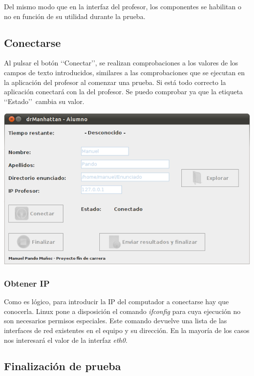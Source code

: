 \documentclass[11pt]{article}
\begin{document}
Del mismo modo que en la interfaz del profesor, los componentes se habilitan o no en función de su utilidad durante la prueba.

\subsection{Conectarse}
\label{sec:conectarse}

Al pulsar el botón \lq\lq Conectar\rq\rq, se realizan comprobaciones a los valores de los campos de texto introducidos, similares a las comprobaciones que se ejecutan en la aplicación del profesor al comenzar una prueba. Si está todo correcto la aplicación conectará con la del profesor. Se puedo comprobar ya que la etiqueta \lq\lq Estado\rq\rq \ cambia su valor.
\newline

\begin{center}
    \includegraphics[width=.90\linewidth]{imagenes/Conectado}
\end{center}

\subsubsection{Obtener IP}

Como es lógico, para introducir la IP del computador a conectarse hay que conocerla. Linux pone a disposición el comando \emph{ifconfig} para cuya ejecución no son necesarios permisos especiales. Este comando devuelve una lista de las interfaces de red existentes en el equipo y su dirección. En la mayoría de los casos nos interesará el valor de la interfaz \emph{eth0}.

\subsection{Finalización de prueba}
\label{sec:finAlumno}
\end{document}
